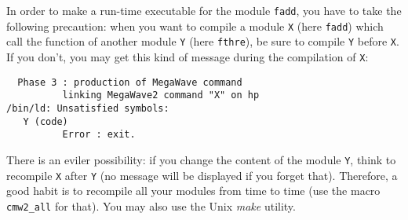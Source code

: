 In order to make a run-time executable for the module \verb+fadd+, you have
to take the following precaution:
when you want to compile a module \verb+X+ (here \verb+fadd+) which call the function of 
another module 
\verb+Y+ (here \verb+fthre+), be sure to compile \verb+Y+ before \verb+X+.
If you don't, you may get this kind of message during the compilation of \verb+X+:
\begin{verbatim}
  Phase 3 : production of MegaWave command
          linking MegaWave2 command "X" on hp
/bin/ld: Unsatisfied symbols:
   Y (code)
          Error : exit.
\end{verbatim}
There is an eviler possibility: if you change the content of the module \verb+Y+, think
to recompile \verb+X+ after \verb+Y+ (no message will be displayed if you forget that).
Therefore, a good habit is to recompile all your modules from time to time
(use the macro \verb+cmw2_all+ for that).
You may also use the Unix {\em make} utility.